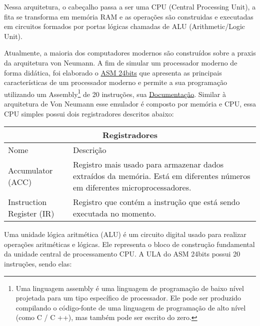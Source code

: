 Nessa arquitetura, o cabeçalho passa a ser uma CPU (Central Processing Unit), a fita se transforma em memória RAM e as operações são construidas e executadas em circuitos formados por portas lógicas  chamadas de ALU (Arithmetic/Logic Unit). \cite{12}

Atualmente, a maioria dos computadores modernos são construídos sobre a praxis da arquitetura von Neumann. A fim de simular um processador moderno de forma didática, foi elaborado o \href{https://gzsig.io/vm-24bits/}{ASM 24bits} que apresenta as principais características de um processador moderno e permite a sua programação utilizando um Assembly\footnote{Uma linguagem assembly é uma linguagem de programação de baixo nível projetada para um tipo específico de processador. Ele pode ser produzido compilando o código-fonte de uma linguagem de programação de alto nível (como C / C ++), mas também pode ser escrito do zero.} de 20 instruções, sua \href{https://github.com/gzsig/Asm/blob/master/README.md}{Documentação}. Similar à arquitetura de Von Neumann esse emulador é composto por memória e CPU, essa CPU simples possui dois registradores descritos abaixo:

\vspace{1cm}
\begin{longtable}{ |p{3cm}||p{11cm}|  }
  \hline
  \multicolumn{2}{|c|}{Registradores} \\
  \hline
    Nome &
    Descrição\\
  \hline
    Accumulator (ACC) &
    Registro mais usado para armazenar dados extraídos da memória. Está em diferentes números em diferentes microprocessadores. \\
  \hline
    Instruction Register (IR) &
    Registro que contém a instrução que está sendo executada no momento. \\
  \hline
\end{longtable}
\vspace{1cm}

Uma unidade lógica aritmética (ALU) é um circuito digital usado para realizar operações aritméticas e lógicas. Ele representa o bloco de construção fundamental da unidade central de processamento CPU. A ULA do ASM 24bits possui 20 instruções, sendo elas:

